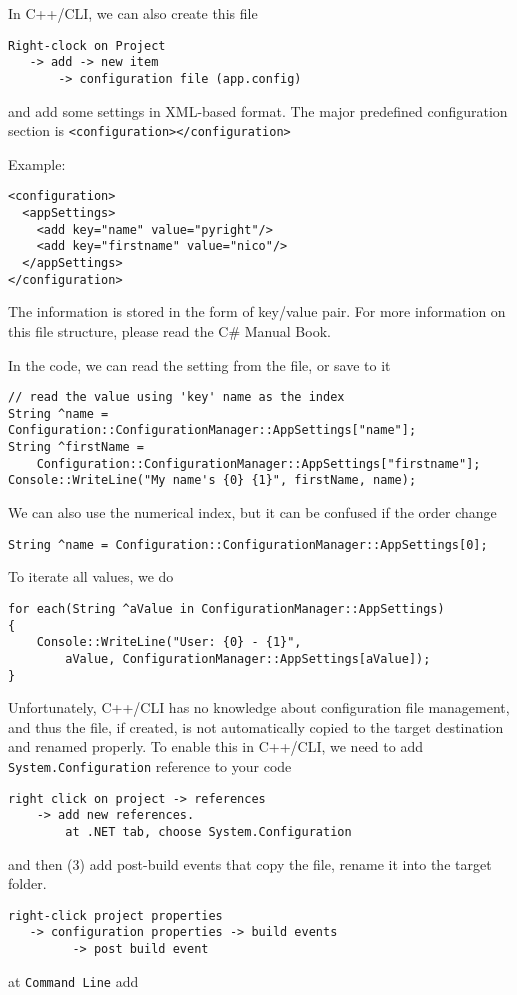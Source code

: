 In C++/CLI, we can also create this file
\begin{verbatim}
Right-clock on Project
   -> add -> new item 
       -> configuration file (app.config)
\end{verbatim}
and add some settings in XML-based format. The major predefined
configuration section is \verb!<configuration></configuration>!

Example:
\begin{verbatim}
<configuration>
  <appSettings>
    <add key="name" value="pyright"/>
    <add key="firstname" value="nico"/>
  </appSettings>
</configuration>
\end{verbatim}
The information is stored in the form of key/value pair. For more information on
this file structure, please read the C\# Manual Book.

In the code, we can read the setting from the file, or save to it
\begin{verbatim}
// read the value using 'key' name as the index 
String ^name = Configuration::ConfigurationManager::AppSettings["name"];
String ^firstName = 
    Configuration::ConfigurationManager::AppSettings["firstname"];
Console::WriteLine("My name's {0} {1}", firstName, name);
\end{verbatim}
We can also use the numerical index, but it can be confused if the order change
\begin{verbatim}
String ^name = Configuration::ConfigurationManager::AppSettings[0];
\end{verbatim}
To iterate all values, we do
\begin{verbatim}
for each(String ^aValue in ConfigurationManager::AppSettings)
{
    Console::WriteLine("User: {0} - {1}", 
        aValue, ConfigurationManager::AppSettings[aValue]);
}
\end{verbatim}

Unfortunately, C++/CLI has no knowledge about configuration file management, and
thus the file, if created, is not automatically copied to the target
destination and renamed properly. To enable this in C++/CLI, we need to add
\verb!System.Configuration! reference to your code
\begin{verbatim}
right click on project -> references 
    -> add new references.
        at .NET tab, choose System.Configuration
\end{verbatim}
and then (3) add post-build events
that copy the file, rename it into the target folder. 
\begin{verbatim}
right-click project properties 
   -> configuration properties -> build events 
         -> post build event 
\end{verbatim}
at \verb!Command Line! add 

